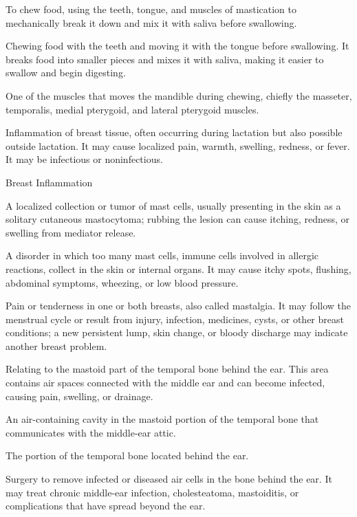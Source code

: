  To chew food, using the teeth, tongue, and muscles of mastication to mechanically break it down and mix it with saliva before swallowing.

 Chewing food with the teeth and moving it with the tongue before swallowing. It breaks food into smaller pieces and mixes it with saliva, making it easier to swallow and begin digesting.

 One of the muscles that moves the mandible during chewing, chiefly the masseter, temporalis, medial pterygoid, and lateral pterygoid muscles.

 Inflammation of breast tissue, often occurring during lactation but also possible outside lactation. It may cause localized pain, warmth, swelling, redness, or fever. It may be infectious or noninfectious.

\synonyms
Breast Inflammation

 A localized collection or tumor of mast cells, usually presenting in the skin as a solitary cutaneous mastocytoma; rubbing the lesion can cause itching, redness, or swelling from mediator release.

 A disorder in which too many mast cells, immune cells involved in allergic reactions, collect in the skin or internal organs. It may cause itchy spots, flushing, abdominal symptoms, wheezing, or low blood pressure.

 Pain or tenderness in one or both breasts, also called mastalgia. It may follow the menstrual cycle or result from injury, infection, medicines, cysts, or other breast conditions; a new persistent lump, skin change, or bloody discharge may indicate another breast problem.

 Relating to the mastoid part of the temporal bone behind the ear. This area contains air spaces connected with the middle ear and can become infected, causing pain, swelling, or drainage.

 An air-containing cavity in the mastoid portion of the temporal bone that communicates with the middle-ear attic.

 The portion of the temporal bone located behind the ear.

 Surgery to remove infected or diseased air cells in the bone behind the ear. It may treat chronic middle-ear infection, cholesteatoma, mastoiditis, or complications that have spread beyond the ear.

